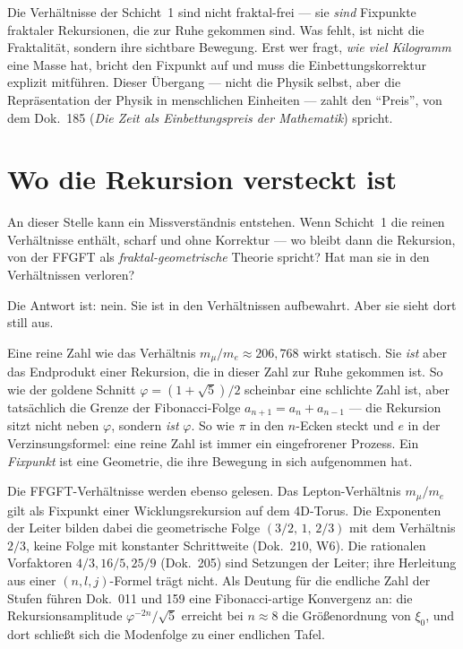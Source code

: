 Die Verhältnisse der Schicht~1 sind nicht fraktal-frei --- sie
\emph{sind} Fixpunkte fraktaler Rekursionen, die zur Ruhe gekommen
sind. Was fehlt, ist nicht die Fraktalität, sondern ihre sichtbare
Bewegung. Erst wer fragt, \emph{wie viel Kilogramm} eine Masse hat,
bricht den Fixpunkt auf und muss die Einbettungskorrektur explizit
mitführen. Dieser Übergang --- nicht die Physik selbst, aber die
Repräsentation der Physik in menschlichen Einheiten --- zahlt den
``Preis'', von dem Dok.~185 (\emph{Die Zeit als Einbettungspreis der
Mathematik}) spricht.

\section{Wo die Rekursion versteckt ist}

An dieser Stelle kann ein Missverständnis entstehen. Wenn Schicht~1
die reinen Verhältnisse enthält, scharf und ohne Korrektur --- wo
bleibt dann die Rekursion, von der FFGFT als \emph{fraktal-geometrische}
Theorie spricht? Hat man sie in den Verhältnissen verloren?

Die Antwort ist: nein. Sie ist in den Verhältnissen aufbewahrt. Aber
sie sieht dort still aus.

Eine reine Zahl wie das Verhältnis $m_{\mu}/m_{e} \approx 206{,}768$
wirkt statisch. Sie \emph{ist} aber das Endprodukt einer Rekursion, die
in dieser Zahl zur Ruhe gekommen ist. So wie der goldene Schnitt
$\varphi = (1+\sqrt{5})/2$ scheinbar eine schlichte Zahl ist, aber
tatsächlich die Grenze der Fibonacci-Folge $a_{n+1} = a_{n} + a_{n-1}$
--- die Rekursion sitzt nicht neben $\varphi$, sondern \emph{ist}
$\varphi$. So wie $\pi$ in den $n$-Ecken steckt und $e$ in der
Verzinsungsformel: eine reine Zahl ist immer ein eingefrorener Prozess.
Ein \emph{Fixpunkt} ist eine Geometrie, die ihre Bewegung in sich
aufgenommen hat.

Die FFGFT-Verhältnisse werden ebenso gelesen. Das Lepton-Verhältnis
$m_{\mu}/m_{e}$ gilt als Fixpunkt einer Wicklungsrekursion auf dem
4D-Torus. Die Exponenten der Leiter bilden dabei die geometrische Folge
$(3/2,\,1,\,2/3)$ mit dem Verhältnis $2/3$, keine Folge mit konstanter
Schrittweite (Dok.~210, W6). Die rationalen Vorfaktoren $4/3, 16/5, 25/9$
(Dok.~205) sind Setzungen der Leiter; ihre Herleitung aus einer
$(n,l,j)$-Formel trägt nicht. Als Deutung für die endliche Zahl der
Stufen führen Dok.~011 und 159 eine Fibonacci-artige Konvergenz an: die
Rekursionsamplitude $\varphi^{-2n}/\sqrt{5}$ erreicht bei $n \approx 8$
die Größenordnung von $\xi_{0}$, und dort schließt sich die Modenfolge
zu einer endlichen Tafel.

